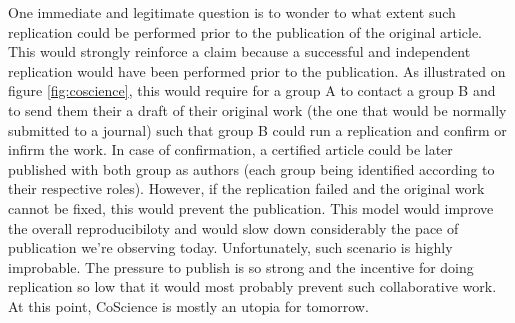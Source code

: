 \documentclass[a4paper,10pt, twocolumn]{article}
\begin{document}
One immediate and legitimate question is to wonder to what extent such
replication could be performed prior to the publication of the original
article. This would strongly reinforce a claim because a successful and
independent replication would have been performed prior to the publication. As
illustrated on figure \ref{fig:coscience}, this would require for a group A to
contact a group B and to send them their a draft of their original work (the
one that would be normally submitted to a journal) such that group B could run
a replication and confirm or infirm the work. In case of confirmation, a
certified article could be later published with both group as authors (each
group being identified according to their respective roles). However, if the
replication failed and the original work cannot be fixed, this would prevent
the publication. This model would improve the overall reproducibiloty and would
slow down considerably the pace of publication we're observing
today. Unfortunately, such scenario is highly improbable. The pressure to
publish is so strong and the incentive for doing replication so low that it
would most probably prevent such collaborative work. At this point, CoScience
is mostly an utopia for tomorrow.





\renewcommand*{\bibfont}{\footnotesize}
\printbibliography[title=References]
\end{document}
